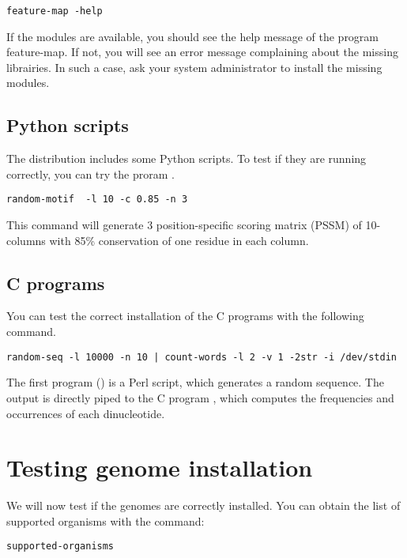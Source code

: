 \begin{lstlisting}
feature-map -help
\end{lstlisting}

If the modules are available, you should see the help message of the
program feature-map. If not, you will see an error message complaining
about the missing librairies. In such a case, ask your system
administrator to install the missing modules.

\subsection{Python scripts}

The \RSAT distribution includes some Python scripts. To test if they
are running correctly, you can try the proram .

\begin{lstlisting}
random-motif  -l 10 -c 0.85 -n 3
\end{lstlisting}

This command will generate 3 position-specific scoring matrix (PSSM)
of 10-columns with 85\% conservation of one residue in each column.

\subsection{C programs}

You can test the correct installation of the C programs with the
following command.

\begin{lstlisting}
random-seq -l 10000 -n 10 | count-words -l 2 -v 1 -2str -i /dev/stdin
\end{lstlisting}

The first program () is a Perl script, which
generates a random sequence. The output is directly piped to the C
program , which computes the frequencies and
occurrences of each dinucleotide.

\section{Testing genome installation}

We will now test if the genomes are correctly installed. You can
obtain the list of supported organisms with the command:

\begin{lstlisting}
supported-organisms
\end{lstlisting}


